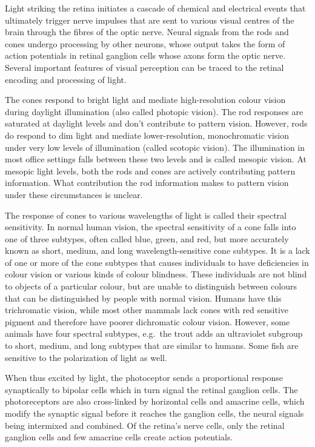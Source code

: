 Light striking the retina initiates a cascade of chemical and electrical
events that ultimately trigger nerve impulses that are sent to various
visual centres of the brain through the fibres of the optic nerve.
Neural signals from the rods and cones undergo processing by other
neurons, whose output takes the form of action potentials in retinal
ganglion cells whose axons form the optic nerve. Several important
features of visual perception can be traced to the retinal encoding and
processing of light.

The cones respond to bright light and mediate high-resolution colour
vision during daylight illumination (also called photopic vision). The
rod responses are saturated at daylight levels and don't contribute to
pattern vision. However, rods do respond to dim light and mediate
lower-resolution, monochromatic vision under very low levels of
illumination (called scotopic vision). The illumination in most office
settings falls between these two levels and is called mesopic vision. At
mesopic light levels, both the rods and cones are actively contributing
pattern information. What contribution the rod information makes to
pattern vision under these circumstances is unclear.

The response of cones to various wavelengths of light is called their
spectral sensitivity. In normal human vision, the spectral sensitivity
of a cone falls into one of three subtypes, often called blue, green,
and red, but more accurately known as short, medium, and long
wavelength-sensitive cone subtypes. It is a lack of one or more of the
cone subtypes that causes individuals to have deficiencies in colour
vision or various kinds of colour blindness. These individuals are not
blind to objects of a particular colour, but are unable to distinguish
between colours that can be distinguished by people with normal vision.
Humans have this trichromatic vision, while most other mammals lack
cones with red sensitive pigment and therefore have poorer dichromatic
colour vision. However, some animals have four spectral subtypes,
e.g.~the trout adds an ultraviolet subgroup to short, medium, and long
subtypes that are similar to humans. Some fish are sensitive to the
polarization of light as well.

When thus excited by light, the photoceptor sends a proportional
response synaptically to bipolar cells which in turn signal the retinal
ganglion cells. The photoreceptors are also cross-linked by horizontal
cells and amacrine cells, which modify the synaptic signal before it
reaches the ganglion cells, the neural signals being intermixed and
combined. Of the retina's nerve cells, only the retinal ganglion cells
and few amacrine cells create action potentials.

